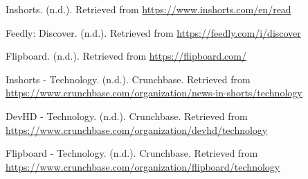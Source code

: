 \documentclass[a4paper]{article}
\begin{document}
\newpage

\begin{thebibliography}{}
    Inshorts. (n.d.). Retrieved from \url{https://www.inshorts.com/en/read}
    
    Feedly: Discover. (n.d.). Retrieved from \url{https://feedly.com/i/discover}
    
    Flipboard. (n.d.). Retrieved from \url{https://flipboard.com/}
    
    Inshorts - Technology. (n.d.). Crunchbase. Retrieved from \url{https://www.crunchbase.com/organization/news-in-shorts/technology}
    
    DevHD - Technology. (n.d.). Crunchbase. Retrieved from \url{https://www.crunchbase.com/organization/devhd/technology}
    
    Flipboard - Technology. (n.d.). Crunchbase. Retrieved from \url{https://www.crunchbase.com/organization/flipboard/technology}
\end{thebibliography}
\end{document}
